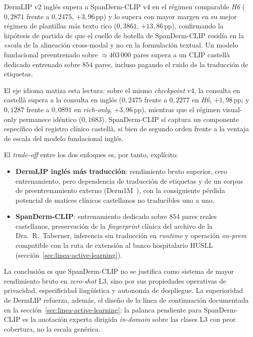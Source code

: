 DermLIP v2 inglés supera a SpanDerm-CLIP v4 en el régimen
comparable \emph{H6} ($0{,}2871$ frente a $0{,}2475$,
$+3{,}96$\,pp) y lo supera con mayor margen en su mejor régimen
de plantillas más texto rico ($0{,}3861$, $+13{,}86$\,pp),
confirmando la hipótesis de partida de que el cuello de botella de
SpanDerm-CLIP residía en la \emph{escala} de la alineación
cross-modal y no en la formulación textual. Un modelo fundacional
preentrenado sobre $\approx 403\,000$ pares supera a un CLIP
castellà dedicado entrenado sobre $854$ pares, incluso pagando el
ruido de la traducción de etiquetas.

El eje idioma matiza esta lectura: sobre el mismo \emph{checkpoint}
v4, la consulta en castellà supera a la consulta en inglés
($0{,}2475$ frente a $0{,}2277$ en \emph{H6}, $+1{,}98$\,pp;
y $0{,}1287$ frente a $0{,}0891$ en \emph{rich-only},
$+3{,}96$\,pp), mientras que el régimen visual-only permanece
idéntico ($0{,}1683$). SpanDerm-CLIP sí captura un componente
específico del registro clínico castellà, si bien de segundo orden
frente a la ventaja de escala del modelo fundacional inglés.

El \emph{trade-off} entre los dos enfoques es, por tanto,
explícito:

\begin{itemize}
  \item \textbf{DermLIP inglés más traducción}: rendimiento bruto
        superior, cero entrenamiento, pero dependencia de
        traducción de etiquetas y de un corpus de preentrenamiento
        externo (Derm1M~\cite{derm1m}), con la consiguiente
        pérdida potencial de matices clínicos castellanos no
        traducibles uno a uno.
  \item \textbf{SpanDerm-CLIP}: entrenamiento dedicado sobre $854$
        pares reales castellanos, preservación de la
        \emph{fingerprint} clínica del archivo de la
        Dra.~R.~Taberner, inferencia sin traducción en
        \emph{runtime} y operación \emph{on-prem} compatible con la
        ruta de extensión al banco hospitalario HUSLL
        (secci\'on~\ref{sec:linea-active-learning}).
\end{itemize}

La conclusión es que SpanDerm-CLIP no se justifica como sistema de
mayor rendimiento bruto en \emph{zero-shot} L3, sino por sus
propiedades operativas de privacidad, especificidad lingüística y
autonomía de despliegue. La superioridad de DermLIP refuerza,
además, el diseño de la línea de continuación documentada en la
secci\'on~\ref{sec:linea-active-learning}: la palanca pendiente
para SpanDerm-CLIP es la anotación experta dirigida
\emph{in-domain} sobre las clases L3 con peor cobertura, no la
escala genérica.

